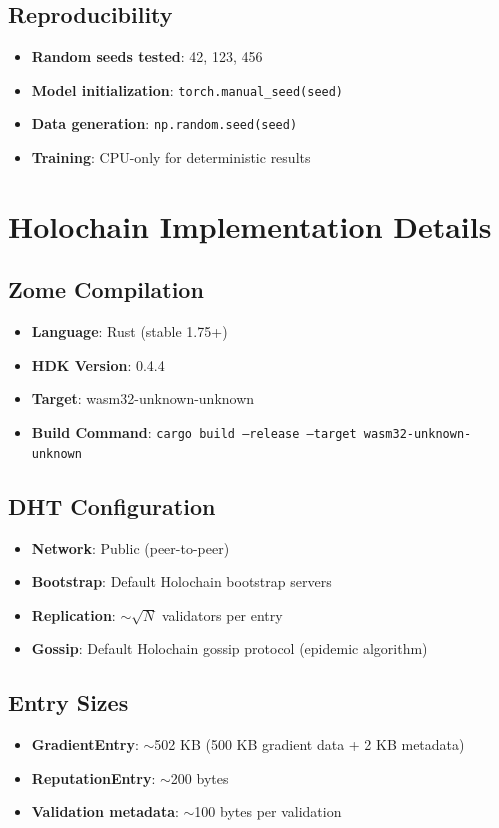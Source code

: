 \subsection{Reproducibility}
\begin{itemize}
    \item \textbf{Random seeds tested}: 42, 123, 456
    \item \textbf{Model initialization}: \texttt{torch.manual\_seed(seed)}
    \item \textbf{Data generation}: \texttt{np.random.seed(seed)}
    \item \textbf{Training}: CPU-only for deterministic results
\end{itemize}

\section{Holochain Implementation Details}

\subsection{Zome Compilation}
\begin{itemize}
    \item \textbf{Language}: Rust (stable 1.75+)
    \item \textbf{HDK Version}: 0.4.4
    \item \textbf{Target}: wasm32-unknown-unknown
    \item \textbf{Build Command}: \texttt{cargo build --release --target wasm32-unknown-unknown}
\end{itemize}

\subsection{DHT Configuration}
\begin{itemize}
    \item \textbf{Network}: Public (peer-to-peer)
    \item \textbf{Bootstrap}: Default Holochain bootstrap servers
    \item \textbf{Replication}: $\sim \sqrt{N}$ validators per entry
    \item \textbf{Gossip}: Default Holochain gossip protocol (epidemic algorithm)
\end{itemize}

\subsection{Entry Sizes}
\begin{itemize}
    \item \textbf{GradientEntry}: $\sim$502 KB (500 KB gradient data + 2 KB metadata)
    \item \textbf{ReputationEntry}: $\sim$200 bytes
    \item \textbf{Validation metadata}: $\sim$100 bytes per validation
\end{itemize}

